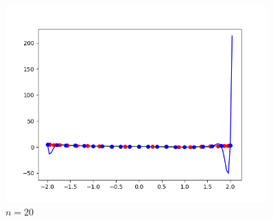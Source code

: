 \documentclass{article}
\begin{document}
\begin{figure}[H]
\caption{$n=20$}
\centering
\includegraphics[width=0.9\textwidth]{f2_20}
\end{figure}
\end{document}
